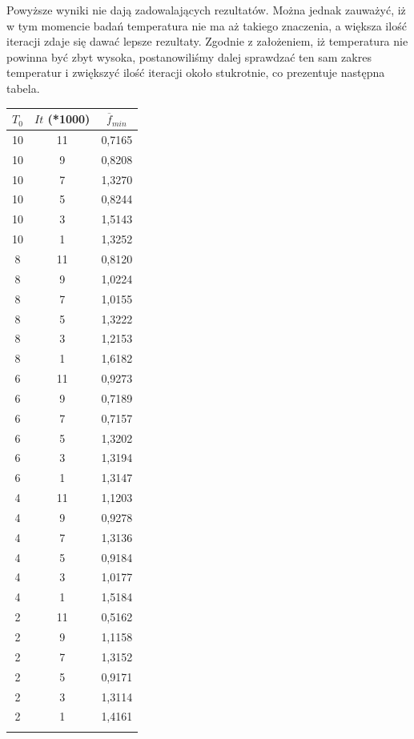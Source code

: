 \documentclass[twoside]{projektInzynierskiMS1}
\newcommand{\si}{ś}
\begin{document}
Powyższe wyniki nie dają zadowalających rezultatów. Można jednak zauważyć, iż w tym momencie badań temperatura nie ma aż takiego znaczenia, a większa ilo\si ć iteracji zdaje się dawać lepsze rezultaty. Zgodnie z założeniem, iż temperatura nie powinna być zbyt wysoka, postanowili\si my dalej sprawdzać ten sam zakres temperatur i zwiększyć ilo\si ć iteracji około stukrotnie, co prezentuje następna tabela.


\begin{tabular}{|c|c|c|} 
                  \hline
                   $T_0$
                  & $It$ (*1000)
                  &$\overline{f}_{min}$\\ \hline


10 & 11 & 0,7165\\ \hline 
10 & 9 & 0,8208 \\ \hline 
10 & 7 & 1,3270 \\ \hline 
10 & 5 & 0,8244 \\ \hline 
10 & 3 & 1,5143 \\ \hline 
10 & 1 & 1,3252 \\ \Xhline{3\arrayrulewidth}

8 & 11 & 0,8120 \\ \hline 
8 & 9 & 1,0224 \\ \hline 
8 & 7 & 1,0155 \\ \hline 
8 & 5 & 1,3222 \\ \hline 
8 & 3 & 1,2153 \\ \hline 
8 & 1 & 1,6182 \\ \Xhline{3\arrayrulewidth}


6 & 11 & 0,9273 \\ \hline 
6 & 9 & 0,7189 \\ \hline 
6 & 7 & 0,7157 \\ \hline 
6 & 5 & 1,3202 \\ \hline 
6 & 3 & 1,3194 \\ \hline 
6 & 1 & 1,3147 \\ \Xhline{3\arrayrulewidth}


4 & 11 & 1,1203 \\ \hline 
4 & 9 & 0,9278 \\ \hline 
4 & 7 & 1,3136 \\ \hline 
4 & 5 & 0,9184 \\ \hline 
4 & 3 & 1,0177 \\ \hline 
4 & 1 & 1,5184 \\ \Xhline{3\arrayrulewidth}

2 & 11 & 0,5162 \\ \hline 
2 & 9 & 1,1158 \\ \hline 
2 & 7 & 1,3152 \\ \hline 
2 & 5 & 0,9171 \\ \hline 
2 & 3 & 1,3114 \\ \hline 
2 & 1 & 1,4161 \\ \Xhline{3\arrayrulewidth}


\end{tabular} \\
\end{document}
